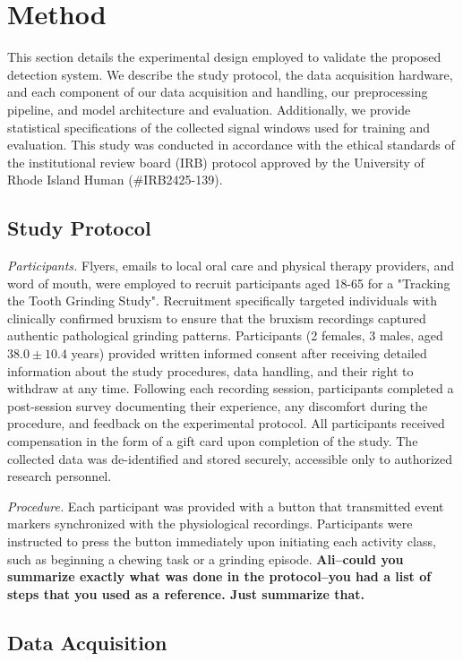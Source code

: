 \documentclass[acmtog, nonacm]{acmart}
\begin{document}
\section{Method}

This section details the experimental design employed to validate the proposed detection system. We describe the study protocol, the data acquisition hardware, and each component of our data acquisition and handling, our preprocessing pipeline, and model architecture and evaluation. Additionally, we provide statistical specifications of the collected signal windows used for training and evaluation.  This study was conducted in accordance with the ethical standards of the institutional review board (IRB) protocol approved by the University of Rhode Island Human (\#IRB2425-139). 

\subsection{Study Protocol}
\textit{Participants.} Flyers, emails to local oral care and physical therapy providers, and word of mouth, were employed to recruit participants aged 18-65 for a "Tracking the Tooth Grinding Study". Recruitment specifically targeted individuals with clinically confirmed bruxism to ensure that the bruxism recordings captured authentic pathological grinding patterns. Participants (2 females, 3 males, aged $38.0 \pm 10.4$ years) provided written informed consent after receiving detailed information about the study procedures, data handling, and their right to withdraw at any time. Following each recording session, participants completed a post-session survey documenting their experience, any discomfort during the procedure, and feedback on the experimental protocol. All participants received compensation in the form of a gift card upon completion of the study. The collected data was de-identified and stored securely, accessible only to authorized research personnel.

\textit{Procedure.} Each participant was provided with a button that transmitted event markers synchronized with the physiological recordings. Participants were instructed to press the button immediately upon initiating each activity class, such as beginning a chewing task or a grinding episode. \textbf{Ali--could you summarize exactly what was done in the protocol--you had a list of steps that you used as a reference. Just summarize that.}

\subsection{Data Acquisition}
\end{document}
